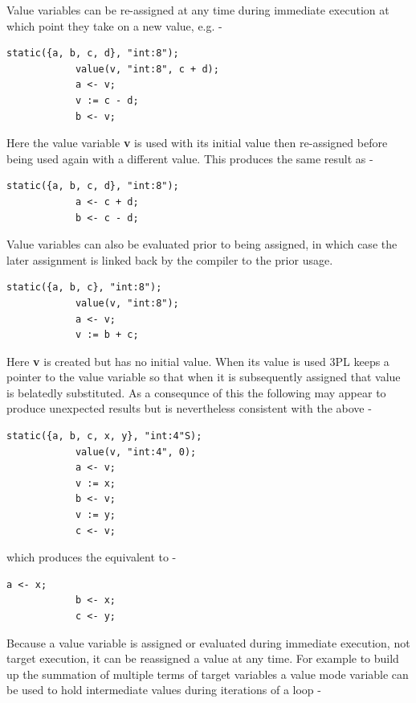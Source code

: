         Value variables can be re-assigned at any time during immediate
        execution at which point they take on a new value, e.g. -
        \begin{lstlisting}[language=threepl]
            static({a, b, c, d}, "int:8");
            value(v, "int:8", c + d);
            a <- v;
            v := c - d;
            b <- v;
        \end{lstlisting}
        Here the value variable {\bf v} is used with its initial value then
        re-assigned before being used again with a different value. This
        produces the same result as -
        \begin{lstlisting}[language=threepl]
            static({a, b, c, d}, "int:8");
            a <- c + d;
            b <- c - d;
        \end{lstlisting}
        
        Value variables can also be evaluated prior to being assigned, in which
        case the later assignment is linked back by the compiler to the prior
        usage.
        \begin{lstlisting}[language=threepl]
            static({a, b, c}, "int:8");
            value(v, "int:8");
            a <- v;
            v := b + c;
        \end{lstlisting}
        Here {\bf v} is created but has no initial value. When its value
        is used 3PL keeps a pointer to the value variable so that when it
        is subsequently assigned that value is belatedly substituted.        
        As a consequnce of this the following may appear to produce
        unexpected results but is nevertheless consistent with the above -
        \begin{lstlisting}[language=threepl]
            static({a, b, c, x, y}, "int:4"S);
            value(v, "int:4", 0);
            a <- v;
            v := x;
            b <- v;
            v := y;
            c <- v;
        \end{lstlisting}
        
        which produces the equivalent to -
        
        \begin{lstlisting}[language=threepl]
            a <- x;
            b <- x;
            c <- y;
        \end{lstlisting}
        
        Because a value variable is assigned or evaluated during immediate execution,
        not target execution, it can be reassigned a value at any time. For example
        to build up the summation of multiple terms of target variables a value
        mode variable can be used to hold intermediate values during iterations of
        a loop -        
        
